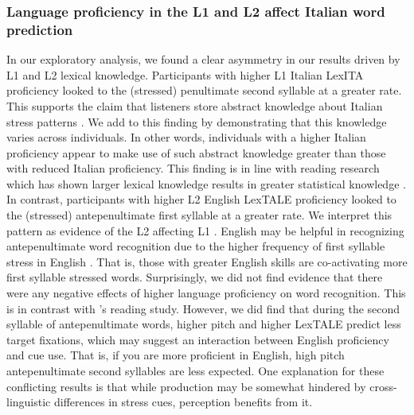 \subsubsection{Language proficiency in the L1 and L2 affect Italian word prediction}

In our exploratory analysis, we found a clear asymmetry in our results driven by L1 and L2 lexical knowledge. Participants with higher L1 Italian LexITA proficiency looked to the (stressed) penultimate second syllable at a greater rate. This supports the claim that listeners store abstract knowledge about Italian stress patterns \citep{Sulpizio_McQueen_2012}. We add to this finding by demonstrating that this knowledge varies across individuals. In other words, individuals with a higher Italian proficiency appear to make use of such abstract knowledge greater than those with reduced Italian proficiency. This finding is in line with reading research which has shown larger lexical knowledge results in greater statistical knowledge \citep{mirman2008attractor, kuperman2013reassessing}. In contrast, participants with higher L2 English LexTALE proficiency looked to the (stressed) antepenultimate first syllable at a greater rate. We interpret this pattern as evidence of the L2 affecting L1 \citep{marian2003competing, dijkstra2002architecture}. English may be helpful in recognizing antepenultimate word recognition due to the higher frequency of first syllable stress in English \cite{cutler2007dutch}. That is, those with greater English skills are co-activating more first syllable stressed words. Surprisingly, we did not find evidence that there were any negative effects of higher language proficiency on word recognition. This is in contrast with \cite{primativo2013bilingual}'s reading study. However, we did find that during the second syllable of antepenultimate words, higher pitch and higher LexTALE predict less target fixations, which may suggest an interaction between English proficiency and cue use. That is, if you are more proficient in English, high pitch antepenultimate second syllables are less expected. One explanation for these conflicting results is that while production may be somewhat hindered by cross-linguistic differences in stress cues, perception benefits from it.

